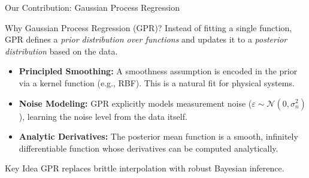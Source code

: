 \documentclass[aspectratio=169]{beamer}
\begin{document}
\begin{frame}{Our Contribution: Gaussian Process Regression}
    \begin{block}{Why Gaussian Process Regression (GPR)?}
    \small
    Instead of fitting a single function, GPR defines a \textit{prior distribution over functions} and updates it to a \textit{posterior distribution} based on the data.
    \begin{itemize}
        \item \textbf{Principled Smoothing:} A smoothness assumption is encoded in the prior via a kernel function (e.g., RBF). This is a natural fit for physical systems.
        \item \textbf{Noise Modeling:} GPR explicitly models measurement noise ($\varepsilon \sim \mathcal{N}(0, \sigma_n^2)$), learning the noise level from the data itself.
        \item \textbf{Analytic Derivatives:} The posterior mean function is a smooth, infinitely differentiable function whose derivatives can be computed analytically.
    \end{itemize}
    \end{block}
    \vspace{1em}
    \begin{alertblock}{Key Idea}
        \centering
        \normalsize
        GPR replaces brittle interpolation with robust Bayesian inference.
    \end{alertblock}
\end{frame}
\end{document}
